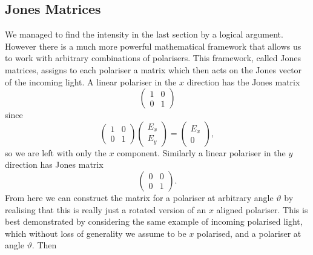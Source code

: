     \subsection{Jones Matrices}
    We managed to find the intensity in the last section by a logical argument.
    However there is a much more powerful mathematical framework that allows us to work with arbitrary combinations of polarisers.
    This framework, called Jones matrices, assigns to each polariser a matrix which then acts on the Jones vector of the incoming light.
    A linear polariser in the \(x\) direction has the Jones matrix
    \[
        \begin{pmatrix}
            1 & 0\\
            0 & 1
        \end{pmatrix}
    \]
    since
    \[
        \begin{pmatrix}
            1 & 0\\
            0 & 1
        \end{pmatrix}
        \begin{pmatrix}
            E_{x}\\ E_{y}
        \end{pmatrix}
        =
        \begin{pmatrix}
            E_x\\ 0
        \end{pmatrix}
        ,
    \]
    so we are left with only the \(x\) component.
    Similarly a linear polariser in the \(y\) direction has Jones matrix
    \[
        \begin{pmatrix}
            0 & 0\\
            0 & 1
        \end{pmatrix}
        .
    \]
    From here we can construct the matrix for a polariser at arbitrary angle \(\vartheta\) by realising that this is really just a rotated version of an \(x\) aligned polariser.
    This is best demonstrated by considering the same example of incoming polarised light, which without loss of generality we assume to be \(x\) polarised, and a polariser at angle \(\vartheta\).
    Then
